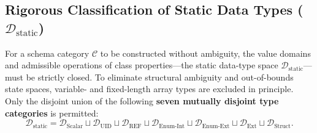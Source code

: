 \documentclass[11pt,a4paper]{article}
\theoremstyle{definition}
\theoremstyle{plain}
\theoremstyle{remark}
\newcommand{\Dstatic}{\mathcal{D}_{\mathrm{static}}}
\newcommand{\Dscalar}{\mathcal{D}_{\mathrm{Scalar}}}
\newcommand{\Duid}{\mathcal{D}_{\mathrm{UID}}}
\newcommand{\Dref}{\mathcal{D}_{\mathrm{REF}}}
\newcommand{\Denumint}{\mathcal{D}_{\mathrm{Enum\text{-}Int}}}
\newcommand{\Denumext}{\mathcal{D}_{\mathrm{Enum\text{-}Ext}}}
\newcommand{\Dext}{\mathcal{D}_{\mathrm{Ext}}}
\newcommand{\Dstruct}{\mathcal{D}_{\mathrm{Struct}}}
\begin{document}
\subsection{Rigorous Classification of Static Data Types ($\Dstatic$)}
For a schema category $\mathcal{C}$ to be constructed without ambiguity, the value domains and admissible operations of class properties---the static data-type space $\Dstatic$---must be strictly closed. To eliminate structural ambiguity and out-of-bounds state spaces, variable- and fixed-length array types are excluded in principle. Only the disjoint union of the following \textbf{seven mutually disjoint type categories} is permitted:
\begin{equation}
\Dstatic = \Dscalar \sqcup \Duid \sqcup \Dref \sqcup \Denumint \sqcup \Denumext \sqcup \Dext \sqcup \Dstruct.
\end{equation}
\end{document}
